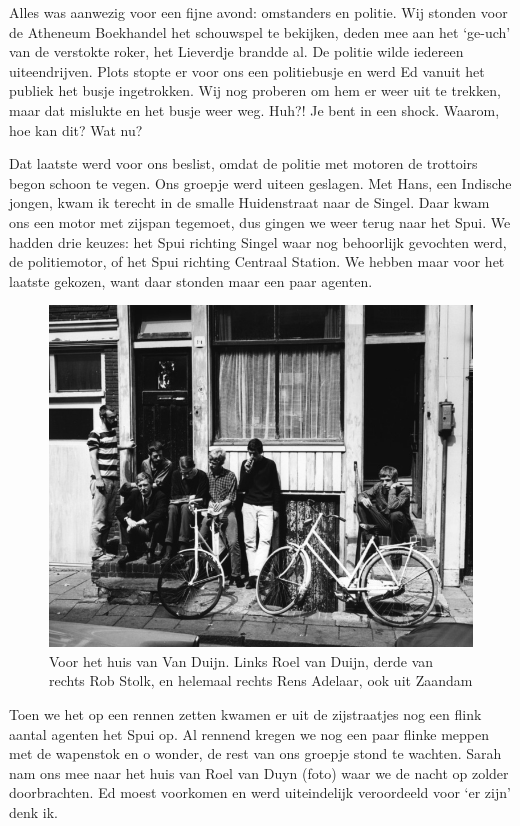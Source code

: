 \documentclass[12pt,twoside, openright]{memoir}
\begin{document}
Alles was aanwezig voor een fijne avond: omstanders en politie. Wij stonden voor de Atheneum Boekhandel het schouwspel te bekijken, deden mee aan het ‘ge-uch’ van de verstokte roker, het Lieverdje brandde al. De politie wilde iedereen uiteendrijven. Plots stopte er voor ons een politiebusje en werd Ed vanuit het publiek het busje ingetrokken. Wij nog proberen om hem er weer uit te trekken, maar dat mislukte en het busje weer weg. Huh?! Je bent in een shock. Waarom, hoe kan dit? Wat nu? 

Dat laatste werd voor ons beslist, omdat de politie met motoren de trottoirs begon schoon te vegen. Ons groepje werd uiteen geslagen. Met Hans, een Indische jongen, kwam ik terecht in de smalle Huidenstraat naar de Singel. Daar kwam ons een motor met zijspan tegemoet, dus gingen we weer terug naar het Spui. We hadden drie keuzes: het Spui richting Singel waar nog behoorlijk gevochten werd, de politiemotor, of het Spui richting Centraal Station. We hebben maar voor het laatste gekozen, want daar stonden maar een paar agenten. 

\begin{figure}
\centering
\includegraphics[width=\textwidth]{img/152-duijn-stolk}
\caption*{\footnotesize Voor het huis van Van Duijn. Links Roel van Duijn, derde van rechts Rob Stolk, en helemaal rechts Rens Adelaar, ook uit Zaandam}
\end{figure}

Toen we het op een rennen zetten kwamen er uit de zijstraatjes nog een flink aantal agenten het Spui op. Al rennend kregen we nog een paar flinke meppen met de wapenstok en o wonder, de rest van ons groepje stond te wachten. Sarah nam ons mee naar het huis van Roel van Duyn (foto) waar we de nacht op zolder doorbrachten. Ed moest voorkomen en werd uiteindelijk veroordeeld voor ‘er zijn’ denk ik. 
\end{document}
